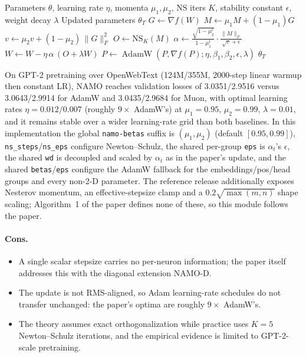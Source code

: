 \begin{algorithm}[H]
\caption{NAMO (Norm-Based Adaptive Moment Estimation with Orthogonalized Momentum)}
\label{alg:namo}
\begin{algorithmic}[1]
\Require Parameters $\theta$, learning rate $\eta$, momenta $\mu_1,\mu_2$, NS iters $K$, stability constant $\epsilon$, weight decay $\lambda$
\Ensure Updated parameters $\theta_T$
        \State $G \gets \nabla f(W)$ 
        \State $M \gets \mu_1 M + (1-\mu_1) G$ 
        \State $v \gets \mu_2 v + (1-\mu_2)\,\lVert G\rVert_F^2$ 
        \State $O \gets \mathrm{NS}_K(M)$ 
        \State $\alpha \gets \frac{\sqrt{1-\mu_2^t}}{1-\mu_1^t}\cdot\frac{\lVert M\rVert_F}{\sqrt{v}+\epsilon}$ 
        \State $W \gets W - \eta\,\alpha\,(O + \lambda W)$ 
    \Else
        \State $P \gets \operatorname{AdamW}(P, \nabla f(P); \eta, \beta_1, \beta_2, \epsilon, \lambda)$ 
    \EndIf
\EndFor
\Return $\theta_T$
\end{algorithmic}
\end{algorithm}

On GPT-2 pretraining over OpenWebText (124M/355M, 2000-step linear warmup then constant
LR), NAMO reaches validation losses of 3.0351/2.9516 versus 3.0643/2.9914 for AdamW and
3.0435/2.9684 for Muon, with optimal learning rates $\eta=0.012/0.007$ (roughly $9\times$
AdamW's) at $\mu_1=0.95$, $\mu_2=0.99$, $\lambda=0.01$, and it remains stable over a
wider learning-rate grid than both baselines. In this implementation the global
\texttt{namo-betas} suffix is $(\mu_1,\mu_2)$ (default $[0.95,0.99]$),
\texttt{ns\_steps}/\texttt{ns\_eps} configure Newton--Schulz, the shared per-group
\texttt{eps} is $\alpha_t$'s $\epsilon$, the shared \texttt{wd} is decoupled and scaled
by $\alpha_t$ as in the paper's update, and the shared \texttt{betas}/\texttt{eps}
configure the AdamW fallback for the embeddings/pos/head groups and every non-2-D
parameter. The reference release additionally exposes Nesterov momentum, an
effective-stepsize clamp and a $0.2\sqrt{\max(m,n)}$ shape scaling; Algorithm~1 of the
paper defines none of these, so this module follows the paper.

\paragraph{Cons.}
\begin{itemize}[leftmargin=*]
\item A single scalar stepsize carries no per-neuron information; the paper itself
  addresses this with the diagonal extension NAMO-D.
\item The update is not RMS-aligned, so Adam learning-rate schedules do not transfer
  unchanged: the paper's optima are roughly $9\times$ AdamW's.
\item The theory assumes exact orthogonalization while practice uses $K{=}5$
  Newton--Schulz iterations, and the empirical evidence is limited to GPT-2-scale
  pretraining.
\end{itemize}

